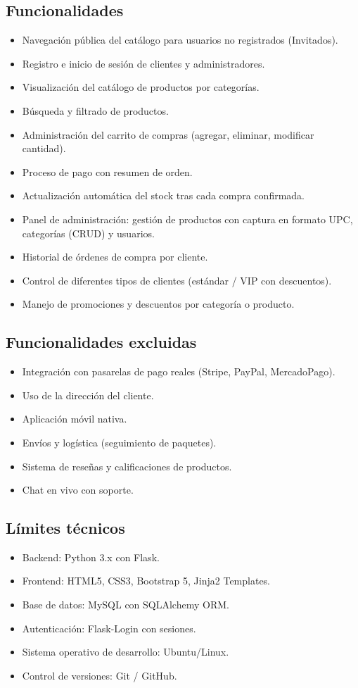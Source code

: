 \documentclass[12pt,a4paper]{article}
\begin{document}
\subsection{Funcionalidades}
\begin{itemize}[label=--]
    \item Navegación pública del catálogo para usuarios no registrados (Invitados).
    \item Registro e inicio de sesión de clientes y administradores.
    \item Visualización del catálogo de productos por categorías.
    \item Búsqueda y filtrado de productos.
    \item Administración del carrito de compras (agregar, eliminar, modificar cantidad).
    \item Proceso de pago con resumen de orden.
    \item Actualización automática del stock tras cada compra confirmada.
    \item Panel de administración: gestión de productos con captura en formato UPC, categorías (CRUD) y usuarios.
    \item Historial de órdenes de compra por cliente.
    \item Control de diferentes tipos de clientes (estándar / VIP con descuentos).
    \item Manejo de promociones y descuentos por categoría o producto.
\end{itemize}

\subsection{Funcionalidades excluidas}
\begin{itemize}[label=--]
    \item Integración con pasarelas de pago reales (Stripe, PayPal, MercadoPago).
    \item Uso de la dirección del cliente.
    \item Aplicación móvil nativa.
    \item Envíos y logística (seguimiento de paquetes).
    \item Sistema de reseñas y calificaciones de productos.
    \item Chat en vivo con soporte.
\end{itemize}

\subsection{Límites técnicos}
\begin{itemize}[label=--]
    \item Backend: Python 3.x con Flask.
    \item Frontend: HTML5, CSS3, Bootstrap 5, Jinja2 Templates.
    \item Base de datos: MySQL con SQLAlchemy ORM.
    \item Autenticación: Flask-Login con sesiones.
    \item Sistema operativo de desarrollo: Ubuntu/Linux.
    \item Control de versiones: Git / GitHub.
\end{itemize}
\end{document}
